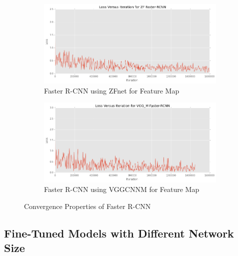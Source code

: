 \begin{figure}[H]
\centering
\begin{subfigure}[t]{.49\textwidth}
    \centering
    \includegraphics[width=1.0\linewidth]{img/FRCNN_zf_cov.png}
    \caption{Faster R-CNN using ZFnet for Feature Map}
\end{subfigure}
\begin{subfigure}[t]{.49\textwidth}
    \centering
    \includegraphics[width=1.0\linewidth]{img/FRCNN_vgg_m_cov.png}
    \caption{Faster R-CNN using VGG\textunderscore CNN\textunderscore M for Feature Map}
\end{subfigure}
\caption{Convergence Properties of Faster R-CNN}
\end{figure}


\subsection{Fine-Tuned Models with Different Network Size}

